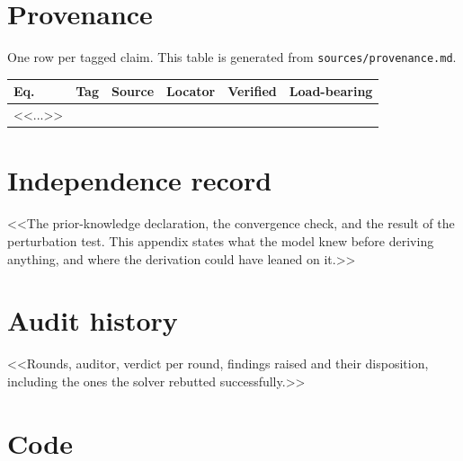 \documentclass[11pt,a4paper]{article}
\begin{document}
\appendix

\section{Provenance}\label{app:provenance}
One row per tagged claim. This table is generated from
\texttt{sources/provenance.md}.

\begin{longtable}{llllll}
\toprule
Eq. & Tag & Source & Locator & Verified & Load-bearing \\
\midrule
<<...>> \\
\bottomrule
\end{longtable}

\section{Independence record}\label{app:independence}
<<The prior-knowledge declaration, the convergence check, and the result of the
perturbation test. This appendix states what the model knew before deriving
anything, and where the derivation could have leaned on it.>>

\section{Audit history}\label{app:audit}
<<Rounds, auditor, verdict per round, findings raised and their disposition,
including the ones the solver rebutted successfully.>>

\section{Code}\label{app:code}




\end{document}
